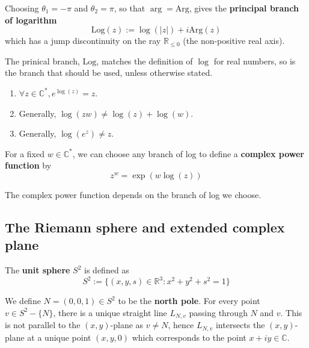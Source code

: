 \begin{definition}
	Choosing $\theta_1 = -\pi$ and $\theta_2 = \pi$, so that $\arg = \text{Arg}$, gives the \textbf{principal branch of logarithm}
	\[
		\text{Log}(z) := \log(|z|) + i \text{Arg}(z)
	\]
	which has a jump discontinuity on the ray $\mathbb{R}_{\le 0}$ (the non-positive real axis).
\end{definition}

\begin{remark}
	The prinical branch, $\text{Log}$, matches the definition of $\log$ for real numbers, so is the branch that should be used, unless otherwise stated.
\end{remark}

\begin{lemma}
	\hfill
	\begin{enumerate}
		\item $\forall z \in \mathbb{C}^*, e^{\log(z)} = z$.
		\item Generally, $\log(zw) \ne \log(z) + \log(w)$.
		\item Generally, $\log(e^z) \ne z$.
	\end{enumerate}
\end{lemma}

\begin{definition}
	For a fixed $w \in \mathbb{C}^*$, we can choose any branch of log to define a \textbf{complex power function} by
	\[
		z^w = \exp(w \log(z))
	\]
\end{definition}

\begin{remark}
	The complex power function depends on the branch of log we choose.
\end{remark}

\subsection{The Riemann sphere and extended complex plane}

\begin{definition}
	The \textbf{unit sphere} $S^2$ is defined as
	\[
		S^2 := \{ (x, y, s) \in \mathbb{R}^3: x^2 + y^2 + s^2 = 1 \}
	\]
\end{definition}

\begin{definition}
	We define $N = (0, 0, 1) \in S^2$ to be the \textbf{north pole}. For every point $v \in S^2 - \{ N \}$, there is a unique straight line $L_{N, v}$ passing through $N$ and $v$. This is not parallel to the $(x, y)$-plane as $v \ne N$, hence $L_{N, v}$ intersects the $(x, y)$-plane at a unique point $(x, y, 0)$ which corresponds to the point $x + iy \in \mathbb{C}$.
\end{definition}

